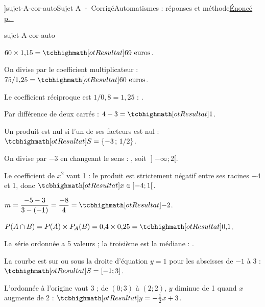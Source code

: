 \editionPage[\pdfbookmark[0]{Corrigés des sujets blancs}{bm-corriges-sujets}]{sujet-A-cor-auto}{Sujet A · Corrigé}{Automatismes : réponses et méthode}{\hyperref[sujet-A]{Énoncé p.~\pageref*{sujet-A}}}
\begin{blocEdition}{sujet-A-cor-auto}
\begin{questions}\item $60\times1{,}15=\res{69\text{ euros}}$.
\item On divise par le coefficient multiplicateur : $75/1{,}25=\res{60\text{ euros}}$.
\item Le coefficient réciproque est $1/0{,}8=1{,}25$ : .
\item Par différence de deux carrés : $4-3=\res{1}$.
\item Un produit est nul si l’un de ses facteurs est nul : $\res{S=\{-3\,;\,1/2\}}$.
\item On divise par $-3$ en changeant le sens : , soit $\mathopen{]}-\infty;2[$.
\item Le coefficient de $x^2$ vaut 1 : le produit est strictement négatif entre ses racines $-4$ et 1, donc $\res{x\in\mathopen{]}-4;1[}$.
\item $m=\dfrac{-5-3}{3-(-1)}=\dfrac{-8}{4}=\res{-2}$.
\item $P(A\cap B)=P(A)\times P_A(B)=0{,}4\times0{,}25=\res{0{,}1}$.
\item La série ordonnée a 5 valeurs ; la troisième est la médiane : .
\item La courbe est sur ou sous la droite d’équation $y=1$ pour les abscisses de $-1$ à 3 : $\res{S=[-1;3]}$.
\item L’ordonnée à l’origine vaut 3 ; de $(0;3)$ à $(2;2)$, $y$ diminue de 1 quand $x$ augmente de 2 : $\res{y=-\tfrac12x+3}$.\end{questions}
\label{figedition-sujet-A-cor-auto-1}
\end{blocEdition}

